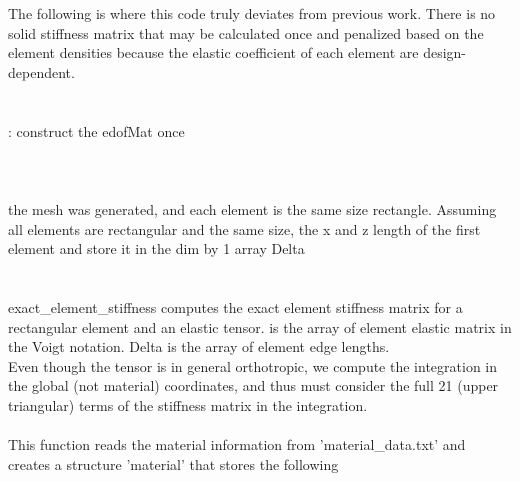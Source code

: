 The following is where this code truly deviates from previous work. There is no solid stiffness matrix that may be calculated once and penalized based on the element densities because the elastic coefficient of each element are design-dependent. \\
\tikzcircle{2pt}\indent{}\\
\tikzcircle{2pt}\indent{}\\
\indent\indent{}: construct the edofMat once\\
\indent\indent{} \\
\indent\indent{} \\
\indent\indent{}\\
the mesh was generated, and each element is the same size rectangle. Assuming all elements are rectangular and the same size, the x and z length of the first element and store it in the dim by 1 array Delta \\
\indent\indent\indent{} \\
\indent\indent\indent{} \\
exact\_element\_stiffness computes the exact element stiffness matrix for a rectangular element and an elastic tensor.  is the  array of element elastic matrix in the Voigt notation. Delta is the array of element edge lengths. \\
Even though the tensor is in general orthotropic, we compute the integration in the global (not material) coordinates, and thus must consider the full 21 (upper triangular) terms of the stiffness matrix in the integration. \\
\tikzcircle{2pt}\indent{} \\
This function reads the material information from 'material\_data.txt' and creates a structure 'material' that stores the following \\
\indent\indent\indent{} \\
\indent\indent\indent{} \\
\indent\indent\indent{} \\
\\


